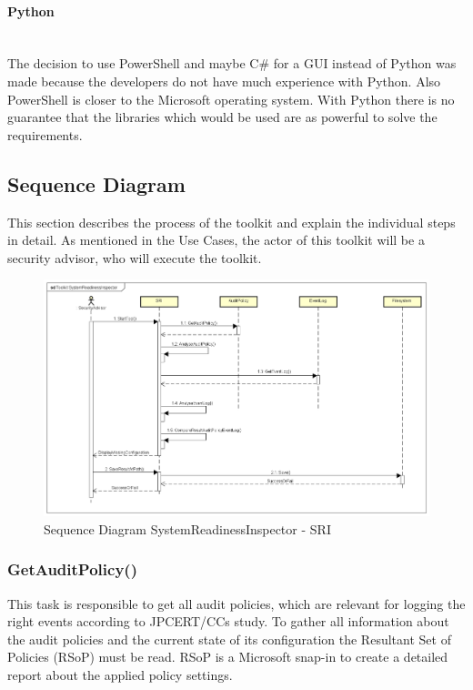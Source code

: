 \paragraph{Python}\ \\
The decision to use PowerShell and maybe C\# for a GUI instead of Python was made because the developers do not have much experience with Python. Also PowerShell is closer to the Microsoft operating system. With Python there is no guarantee that the libraries which would be used are as powerful to solve the requirements.


\subsection{Sequence Diagram}
This section describes the process of the toolkit and explain the individual steps in detail. As mentioned in the Use Cases, the actor of this toolkit will be a security advisor, who will execute the toolkit.

\begin{figure}[H]
    \centering
    \includegraphics[width=1\linewidth]{assets/design-tool/SequenceDiagramSRI.png}
    \caption{Sequence Diagram SystemReadinessInspector - SRI}
\end{figure}

\clearpage

\subsubsection{GetAuditPolicy()}
This task is responsible to get all audit policies, which are relevant for logging the right events according to JPCERT/CCs study. To gather all information about the audit policies and the current state of its configuration  the Resultant Set of Policies (RSoP) must be read. \cite{RSoP} RSoP is a Microsoft snap-in to create a detailed report about the applied policy settings. 

